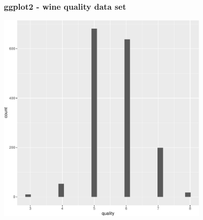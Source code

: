 \begin{frame}
\frametitle{ggplot2 - wine quality data set}
\centering



\framebreak
 

\framebreak
 

\framebreak
 
\includegraphics[width=0.8\textwidth,height=0.7\textheight,keepaspectratio]{examples/ex-ggplot-01-crop.pdf}


\end{frame}

